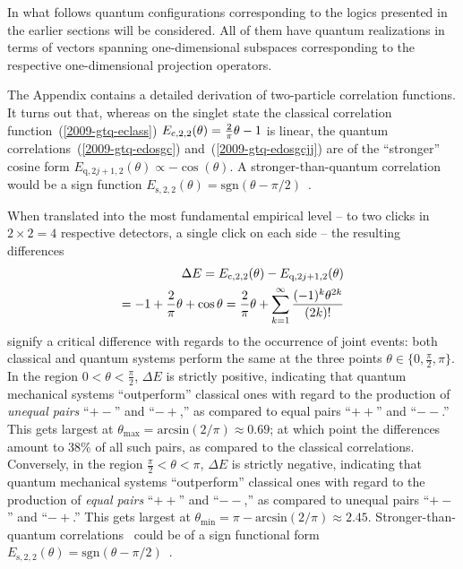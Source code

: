 \documentclass[%
  twocolumn,
 showpacs,
 showkeys,
 preprintnumbers,
 amsmath,amssymb,
 aps,
  pra,
  longbibliography,
 floatfix,
 ]{revtex4-1}
\begin{document}
In what follows quantum configurations corresponding to the logics presented in the earlier sections will be considered.
All of them have quantum realizations in terms of vectors spanning one-dimensional subspaces
corresponding to the respective one-dimensional projection operators.

The Appendix contains a detailed derivation of two-particle correlation functions.
It turns out that, whereas on the singlet state the classical correlation function~(\ref{2009-gtq-eclass})
$
E_{\text{c},2,2}(\theta )  = {2 \over \pi}\theta - 1
$
is linear,
the quantum correlations~(\ref{2009-gtq-edosgc}) and~(\ref{2009-gtq-edosgcjj})  are of the ``stronger'' cosine form
$
E_{\text{q},2j+1,2}(\theta )\propto -\cos (\theta )
$.
A stronger-than-quantum correlation would be a sign function
$
E_{\text{s},2,2}(\theta )= \text{sgn} (\theta-\pi /2 )
$~\cite{svozil-krenn}.

When translated into the most fundamental empirical level
-- to two clicks in $2\times 2 =4$ respective detectors, a single click on each side -- the resulting differences
\begin{equation}
\begin{split}
\Delta E = E_{\text{c},2,2}(\theta ) - E_{\text{q},2j+1,2}(\theta ) \\
= -1 + {2 \over \pi}\theta + \cos \theta
= {2 \over \pi}\theta + \sum_{k=1}^\infty \frac{(-1)^k \theta^{2k}}{(2k)!}
\label{2017-b-ch-diffev}
\end{split}
\end{equation}
signify a critical difference
with regards to the occurrence of joint events:
both classical and quantum systems perform the same at the three points
$\theta \in \{0, \frac{\pi}{2},\pi\}$.
In the region
$0 < \theta <\frac{\pi}{2}$,
$\Delta E $ is strictly positive, indicating that quantum mechanical systems ``outperform''
classical ones with regard to the production of {\em unequal pairs} ``$+-$''  and ``$-+$,''
as compared to equal pairs  ``$++$''  and ``$--$.''
This gets largest at $\theta_{\text{max}}=\text{arcsin}({2}/{\pi}) \approx 0.69$;
at which point the differences amount to 38\%
of all such pairs, as compared to the classical correlations.
Conversely,
in the region
$ \frac{\pi}{2} < \theta <\pi $,
$\Delta E $ is strictly negative, indicating that quantum mechanical systems ``outperform''
classical ones with regard to the production of {\em  equal pairs} ``$++$''  and ``$--$,''
as compared to unequal pairs   ``$+-$''  and ``$-+$.''
This gets largest at $\theta_{\text{min}}= \pi -\text{arcsin}({2}/{\pi}) \approx 2.45$.
Stronger-than-quantum correlations~\cite{popescu-97,popescu-2014} could be of a sign functional form
$
E_{\text{s},2,2}(\theta )= \text{sgn} (\theta-\pi /2 )
$~\cite{svozil-krenn}.
\end{document}
